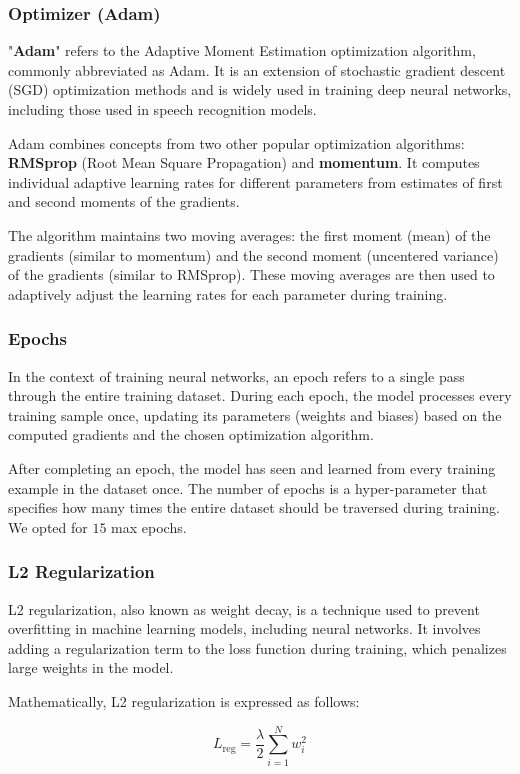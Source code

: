 \documentclass[a4paper]{report}
\begin{document}
{\subsubsection{Optimizer (Adam)}
"\textbf{Adam}" refers to the Adaptive Moment Estimation optimization algorithm, commonly abbreviated as Adam. It is an extension of stochastic gradient descent (SGD) optimization methods and is widely used in training deep neural networks, including those used in speech recognition models.

Adam combines concepts from two other popular optimization algorithms: \textbf{RMSprop} (Root Mean Square Propagation) and \textbf{momentum}. It computes individual adaptive learning rates for different parameters from estimates of first and second moments of the gradients.

The algorithm maintains two moving averages: the first moment (mean) of the gradients (similar to momentum) and the second moment (uncentered variance) of the gradients (similar to RMSprop). These moving averages are then used to adaptively adjust the learning rates for each parameter during training.
\subsubsection{Epochs}
In the context of training neural networks, an epoch refers to a single pass through the entire training dataset. During each epoch, the model processes every training sample once, updating its parameters (weights and biases) based on the computed gradients and the chosen optimization algorithm.

After completing an epoch, the model has seen and learned from every training example in the dataset once. The number of epochs is a hyper-parameter that specifies how many times the entire dataset should be traversed during training. We opted for $15$ max epochs.
\subsubsection{L2 Regularization}
L2 regularization, also known as weight decay, is a technique used to prevent overfitting in machine learning models, including neural networks. It involves adding a regularization term to the loss function during training, which penalizes large weights in the model.

Mathematically, L2 regularization is expressed as follows:

\[
L_{\text{reg}} = \frac{\lambda}{2} \sum_{i=1}^{N} w_i^2
\]

}
\end{document}
